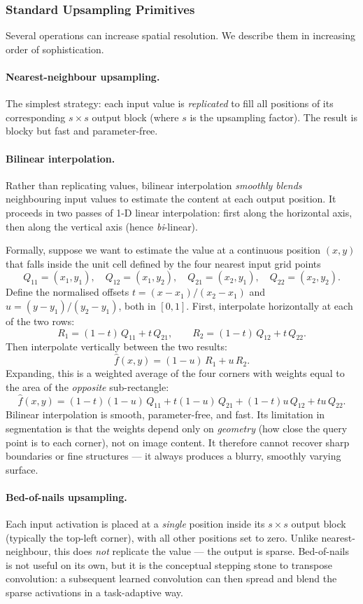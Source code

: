 \documentclass[11pt,a4paper]{article}
\begin{document}
\subsubsection{Standard Upsampling Primitives}

Several operations can increase spatial resolution. We describe them in increasing order of sophistication.

\paragraph{Nearest-neighbour upsampling.}
The simplest strategy: each input value is \emph{replicated} to fill all positions of its corresponding $s\times s$ output block (where $s$ is the upsampling factor). The result is blocky but fast and parameter-free.

\paragraph{Bilinear interpolation.}
Rather than replicating values, bilinear interpolation \emph{smoothly blends} neighbouring input values to estimate the content at each output position. It proceeds in two passes of 1-D linear interpolation: first along the horizontal axis, then along the vertical axis (hence \emph{bi}-linear).

Formally, suppose we want to estimate the value at a continuous position $(x,y)$ that falls inside the unit cell defined by the four nearest input grid points
\[
  Q_{11}=(x_1,y_1),\quad Q_{12}=(x_1,y_2),\quad Q_{21}=(x_2,y_1),\quad Q_{22}=(x_2,y_2).
\]
Define the normalised offsets $t = (x-x_1)/(x_2-x_1)$ and $u = (y-y_1)/(y_2-y_1)$, both in $[0,1]$. First, interpolate horizontally at each of the two rows:
\[
  R_1 = (1-t)\,Q_{11} + t\,Q_{21}, \qquad R_2 = (1-t)\,Q_{12} + t\,Q_{22}.
\]
Then interpolate vertically between the two results:
\[
  \hat{f}(x,y) = (1-u)\,R_1 + u\,R_2.
\]
Expanding, this is a weighted average of the four corners with weights equal to the area of the \emph{opposite} sub-rectangle:
\[
  \hat{f}(x,y) = (1-t)(1-u)\,Q_{11} + t(1-u)\,Q_{21} + (1-t)u\,Q_{12} + tu\,Q_{22}.
\]
Bilinear interpolation is smooth, parameter-free, and fast. Its limitation in segmentation is that the weights depend only on \emph{geometry} (how close the query point is to each corner), not on image content. It therefore cannot recover sharp boundaries or fine structures — it always produces a blurry, smoothly varying surface.

\paragraph{Bed-of-nails upsampling.}
Each input activation is placed at a \emph{single} position inside its $s\times s$ output block (typically the top-left corner), with all other positions set to zero. Unlike nearest-neighbour, this does \emph{not} replicate the value — the output is sparse. Bed-of-nails is not useful on its own, but it is the conceptual stepping stone to transpose convolution: a subsequent learned convolution can then spread and blend the sparse activations in a task-adaptive way.
\end{document}
